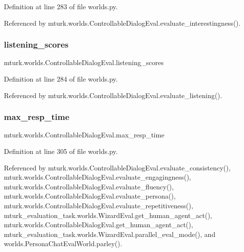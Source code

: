 Definition at line 283 of file worlds.\+py.



Referenced by mturk.\+worlds.\+Controllable\+Dialog\+Eval.\+evaluate\+\_\+interestingness().

\mbox{\label{classmturk_1_1worlds_1_1ControllableDialogEval_aadcb4315330df6fe6579fee32686e7be}} 
\subsubsection{\texorpdfstring{listening\+\_\+scores}{listening\_scores}}
{\footnotesize\ttfamily mturk.\+worlds.\+Controllable\+Dialog\+Eval.\+listening\+\_\+scores}



Definition at line 284 of file worlds.\+py.



Referenced by mturk.\+worlds.\+Controllable\+Dialog\+Eval.\+evaluate\+\_\+listening().

\mbox{\label{classmturk_1_1worlds_1_1ControllableDialogEval_adcb6a5fb174ba82acc3229cc648dbfae}} 
\subsubsection{\texorpdfstring{max\+\_\+resp\+\_\+time}{max\_resp\_time}}
{\footnotesize\ttfamily mturk.\+worlds.\+Controllable\+Dialog\+Eval.\+max\+\_\+resp\+\_\+time}



Definition at line 305 of file worlds.\+py.



Referenced by mturk.\+worlds.\+Controllable\+Dialog\+Eval.\+evaluate\+\_\+consistency(), mturk.\+worlds.\+Controllable\+Dialog\+Eval.\+evaluate\+\_\+engagingness(), mturk.\+worlds.\+Controllable\+Dialog\+Eval.\+evaluate\+\_\+fluency(), mturk.\+worlds.\+Controllable\+Dialog\+Eval.\+evaluate\+\_\+persona(), mturk.\+worlds.\+Controllable\+Dialog\+Eval.\+evaluate\+\_\+repetitiveness(), mturk\+\_\+evaluation\+\_\+task.\+worlds.\+Wizard\+Eval.\+get\+\_\+human\+\_\+agent\+\_\+act(), mturk.\+worlds.\+Controllable\+Dialog\+Eval.\+get\+\_\+human\+\_\+agent\+\_\+act(), mturk\+\_\+evaluation\+\_\+task.\+worlds.\+Wizard\+Eval.\+parallel\+\_\+eval\+\_\+mode(), and worlds.\+Persona\+Chat\+Eval\+World.\+parley().


